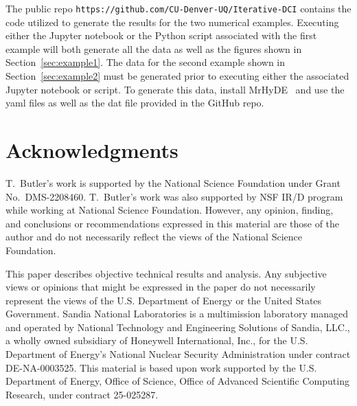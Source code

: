 \documentclass{article}
\newcounter{example}[section]
\begin{document}
The public repo \verb|https://github.com/CU-Denver-UQ/Iterative-DCI| contains the code utilized to generate the results for the two numerical examples.
Executing either the Jupyter notebook or the Python script associated with the first example will both generate all the data as well as the figures shown in Section~\ref{sec:example1}. 
The data for the second example shown in Section~\ref{sec:example2} must be generated prior to executing either the associated Jupyter notebook or script. 
To generate this data, install MrHyDE~\cite{mrhyde_user,mrhyde2023github} and use the yaml files as well as the dat file provided in the GitHub repo. 


\section{Acknowledgments}\label{sec:acknowledgments}
T.~Butler's work is supported by the National Science Foundation under Grant No.~DMS-2208460.
T.~Butler's work was also supported by NSF IR/D program while working at National Science Foundation. 
However, any opinion, finding, and conclusions or recommendations expressed in this material are those of the author and do not necessarily reflect the views of the National Science Foundation.

This paper describes objective technical results and analysis. Any subjective views or opinions that might be expressed in the paper do not necessarily represent the views of the U.S. Department of Energy or the United States Government.
Sandia National Laboratories is a multimission laboratory managed and operated by National Technology and
Engineering Solutions of Sandia, LLC., a wholly owned subsidiary of Honeywell International, Inc.,
for the U.S. Department of Energy’s National Nuclear Security Administration under contract DE-NA-0003525.  This material is based upon work supported by the U.S. Department of Energy, Office of Science, Office of Advanced Scientific Computing Research, under contract 25-025287.

% 

 
\end{document}
